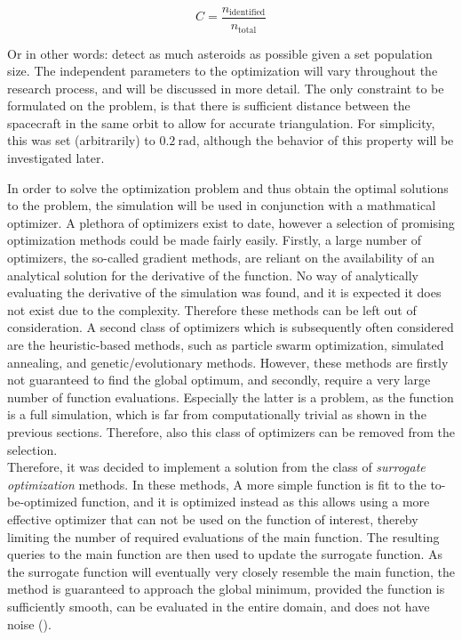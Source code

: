 \begin{equation}
 C = \frac{n_{\mathrm{identified}}}{n_{\mathrm{total}}}
\end{equation}

Or in other words: detect as much asteroids as possible given a set population size. The independent parameters to the optimization will vary throughout the research process, and will be discussed in more detail. The only constraint to be formulated on the problem, is that there is sufficient distance between the spacecraft in the same orbit to allow for accurate triangulation. For simplicity, this was set (arbitrarily) to $0.2~\mathrm{rad}$, although the behavior of this property will be investigated later.

In order to solve the optimization problem and thus obtain the optimal solutions to the problem, the simulation will be used in conjunction with a mathmatical optimizer. A plethora of optimizers exist to date, however a selection of promising optimization methods could be made fairly easily. Firstly, a large number of optimizers, the so-called gradient methods, are reliant on the availability of an analytical solution for the derivative of the function. No way of analytically evaluating the derivative of the simulation was found, and it is expected it does not exist due to the complexity. Therefore these methods can be left out of consideration. A second class of optimizers which is subsequently often considered are the heuristic-based methods, such as particle swarm optimization, simulated annealing, and genetic/evolutionary methods. However, these methods are firstly not guaranteed to find the global optimum, and secondly, require a very large number of function evaluations. Especially the latter is a problem, as the function is a full simulation, which is far from computationally trivial as shown in the previous sections. Therefore, also this class of optimizers can be removed from the selection. \\

Therefore, it was decided to implement a solution from the class of \textit{surrogate optimization} methods. In these methods, A more simple function is fit to the to-be-optimized function, and it is optimized instead as this allows using a more effective optimizer that can not be used on the function of interest, thereby limiting the number of required evaluations of the main function. The resulting queries to the main function are then used to update the surrogate function. As the surrogate function will eventually very closely resemble the main function, the method is guaranteed to approach the global minimum, provided the function is sufficiently smooth, can be evaluated in the entire domain, and does not have noise (\cite{Surrogate}). \\


